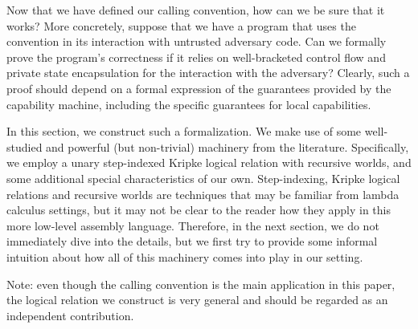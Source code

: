 \documentclass[format=acmsmall, review=true, screen=true]{acmart}
\newenvironment{toplas}{}{}
\begin{document}

\begin{toplas}
Now that we have defined our calling convention, how can we be sure that it
works? More concretely, suppose that we have a program that uses the convention
in its interaction with untrusted adversary code. Can we formally prove the
program's correctness if it relies on well-bracketed control flow and private
state encapsulation for the interaction with the adversary? Clearly, such a
proof should depend on a formal expression of the guarantees provided by the
capability machine, including the specific guarantees for local capabilities.

In this section, we construct such a formalization. We make use of some
well-studied and powerful (but non-trivial) machinery from the literature.
Specifically, we employ a unary step-indexed Kripke logical relation with
recursive worlds, and some additional special characteristics of our own.
Step-indexing, Kripke logical relations and recursive worlds are techniques that
may be familiar from lambda calculus settings, but it may not be clear to the
reader how they apply in this more low-level assembly language. Therefore, in the next section, we do
not immediately dive into the details, but we first try to provide some informal
intuition about how all of this machinery comes into play in our setting.

Note: even though the calling convention is the main application in this paper,
the logical relation we construct is very general and should be regarded as an
independent contribution.


\end{toplas}
\end{document}
